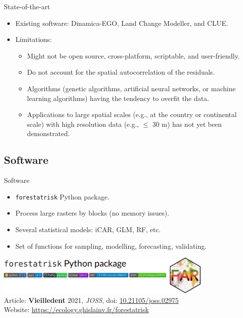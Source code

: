 \documentclass[10pt,table,dvipsnames,compress]{beamer}
\begin{document}
\begin{frame}[label={sec:org750b790}]{State-of-the-art}
\begin{itemize}
\item Existing software: Dinamica-EGO, Land Change Modeller, and CLUE.
\item Limitations:
\begin{itemize}
\item Might not be open source, cross-platform, scriptable, and user-friendly.
\item Do not account for the spatial autocorrelation of the residuals.
\item Algorithms (genetic algorithms, artificial neural networks, or machine learning algorithms) having the tendency to overfit the data.
\item Applications to large spatial scales (e.g., at the country or continental scale) with high resolution data (e.g., \(\leq\) 30 m) has not yet been demonstrated.
\end{itemize}
\end{itemize}
\end{frame}

\subsection{Software}
\label{sec:org414a46e}
\begin{frame}[label={sec:org930252f},fragile]{Software}
 \begin{itemize}
\item \texttt{forestatrisk} Python package.
\item Process large rasters by blocks (no memory issues).
\item Several statistical models: iCAR, GLM, RF, etc.
\item Set of functions for sampling, modelling, forecasting, validating.
\end{itemize}

\begin{center}
\includegraphics[width=0.8\textwidth]{figs/far-Python}\\
Article: \textbf{Vieilledent} 2021, \emph{JOSS}, doi: \href{https://doi.org/10.21105/joss.02975}{10.21105/joss.02975}\\
Website: \url{https://ecology.ghislainv.fr/forestatrisk}
\end{center}
\end{frame}
\end{document}
